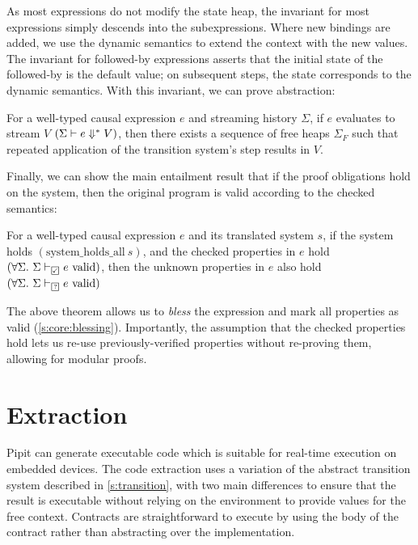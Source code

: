 \documentclass[a4paper,UKenglish,cleveref, autoref, thm-restate,anonymous]{lipics-v2021}
\begin{document}
As most expressions do not modify the state heap, the invariant for most expressions simply descends into the subexpressions.
Where new bindings are added, we use the dynamic semantics to extend the context with the new values.
The invariant for followed-by expressions asserts that the initial state of the followed-by is the default value; on subsequent steps, the state corresponds to the dynamic semantics.
With this invariant, we can prove abstraction:

\begin{theorem}
  For a well-typed causal expression $e$ and streaming history $\Sigma$, if $e$ evaluates to stream $V$ $(\Sigma \vdash e \Downarrow^{*} V)$, then there exists a sequence of free heaps $\Sigma_{F}$ such that repeated application of the transition system's step results in $V$.
\end{theorem}

Finally, we can show the main entailment result that if the proof obligations hold on the system, then the original program is valid according to the checked semantics:

\begin{theorem}
  For a well-typed causal expression $e$ and its translated system $s$, if the system holds $(\text{system_holds_all}~s)$, and the checked properties in $e$ hold $(\forall \Sigma.~\semcheck{\Sigma}{\PSValid}{e})$, then
  the unknown properties in $e$ also hold $(\forall \Sigma.~\semcheck{\Sigma}{\PSUnknown}{e})$
\end{theorem}

The above theorem allows us to \emph{bless} the expression and mark all properties as valid (\autoref{s:core:blessing}).
Importantly, the assumption that the checked properties hold lets us re-use previously-verified properties without re-proving them, allowing for modular proofs.
 


\section{Extraction}
\label{s:extraction}

Pipit can generate executable code which is suitable for real-time execution on embedded devices.
The code extraction uses a variation of the abstract transition system described in \autoref{s:transition}, with two main differences to ensure that the result is executable without relying on the environment to provide values for the free context.
Contracts are straightforward to execute by using the body of the contract rather than abstracting over the implementation.
\end{document}
